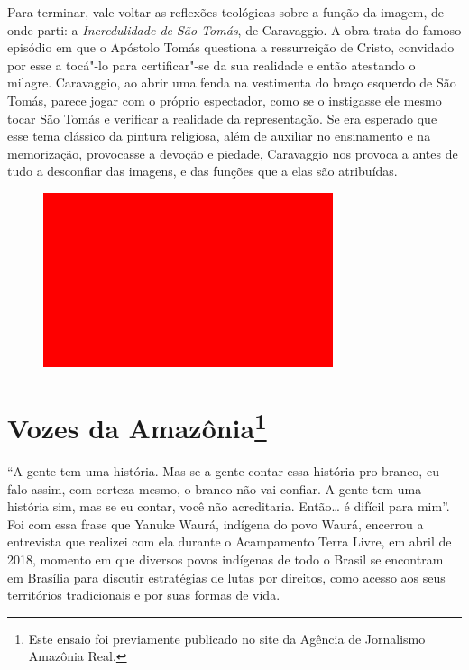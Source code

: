 \asterisc

Para terminar, vale voltar as reflexões teológicas sobre a função da
imagem, de onde parti: a \emph{Incredulidade de São Tomás}, de
Caravaggio. A obra trata do famoso episódio em que o Apóstolo Tomás
questiona a ressurreição de Cristo, convidado por esse a tocá"-lo para
certificar"-se da sua realidade e então atestando o milagre. Caravaggio,
ao abrir uma fenda na vestimenta do braço esquerdo de São Tomás, parece
jogar com o próprio espectador, como se o instigasse ele mesmo tocar São
Tomás e verificar a realidade da representação. Se era esperado que esse
tema clássico da pintura religiosa, além de auxiliar no ensinamento e na
memorização, provocasse a devoção e piedade, Caravaggio nos provoca a
antes de tudo a desconfiar das imagens, e das funções que a elas são
atribuídas.

\begin{figure}[!ht]
\centering
 \includegraphics[width=85mm]{./imgs/im1.jpg}
\caption{\footnotesize{}}
\end{figure}

\chapter{Vozes da Amazônia\footnote{Este ensaio foi
  previamente publicado no site da Agência de Jornalismo Amazônia Real.}}

``A gente tem uma história. Mas se a gente contar essa história pro
branco, eu falo assim, com certeza mesmo, o branco não vai confiar. A
gente tem uma história sim, mas se eu contar, você não acreditaria.
Então\ldots{} é difícil para mim''. Foi com essa frase que Yanuke Waurá,
indígena do povo Waurá, encerrou a entrevista que realizei com ela
durante o Acampamento Terra Livre, em abril de 2018, momento em que
diversos povos indígenas de todo o Brasil se encontram em Brasília para
discutir estratégias de lutas por direitos, como acesso aos seus
territórios tradicionais e por suas formas de vida.

